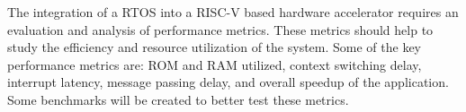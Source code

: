 The integration of a RTOS into a RISC-V based hardware accelerator requires an evaluation and analysis of performance metrics. These metrics should help to study the efficiency and resource utilization of the system. Some of the key performance metrics are: ROM and RAM utilized, context switching delay, interrupt latency, message passing delay, and overall speedup of the application. Some benchmarks will be created to better test these metrics.



